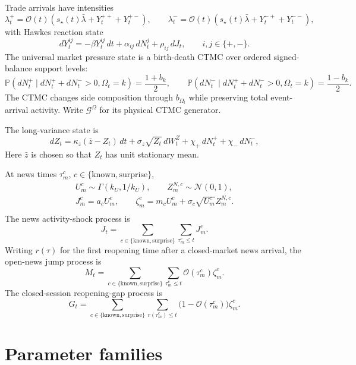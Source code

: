 \documentclass[11pt]{article}
\begin{document}
    Trade arrivals have intensities
    \[
        \lambda_t^+
        =
        \mathcal O(t)
        \left(s_\star(t)\bar\lambda+Y_t^{++}+Y_t^{+-}\right),
        \qquad
        \lambda_t^-
        =
        \mathcal O(t)
        \left(s_\star(t)\bar\lambda+Y_t^{-+}+Y_t^{--}\right),
    \]
    with Hawkes reaction state
    \[
        dY_t^{ij}
        =
        -\beta Y_t^{ij}\,dt
        +
        \alpha_{ij}\,dN_t^j
        +
        \rho_{ij}\,dJ_t,
        \qquad i,j\in\{+,-\}.
    \]
    The universal market pressure state is a birth-death CTMC over ordered
    signed-balance support levels:
    \[
        \mathbb P(dN_t^+\mid dN_t^++dN_t^->0,\Omega_t=k)
        =
        \frac{1+b_k}{2},
        \qquad
        \mathbb P(dN_t^-\mid dN_t^++dN_t^->0,\Omega_t=k)
        =
        \frac{1-b_k}{2}.
    \]
    The CTMC changes side composition through \(b_{\Omega_t}\) while preserving
    total event-arrival activity.
    Write \(\mathcal G^\Omega\) for its physical CTMC generator.

    The long-variance state is
    \[
        dZ_t
        =
        \kappa_z(\bar z-Z_t)\,dt
        +
        \sigma_z\sqrt{Z_t}\,dW_t^Z
        +
        \chi_+\,dN_t^+
        +
        \chi_-\,dN_t^-,
    \]
    Here \(\bar z\) is chosen so that \(Z_t\) has unit stationary mean.

    At news times \(\tau_m^c\), \(c\in\{\mathrm{known},\mathrm{surprise}\}\),
    \begin{gather*}
        U_m^c\sim\Gamma(k_U,1/k_U),
        \qquad
        Z_m^{N,c}\sim\mathcal N(0,1),\\
        J_m^c=a_c U_m^c,
        \qquad
        \zeta_m^c
        =
        m_c U_m^c+\sigma_c\sqrt{U_m^c}Z_m^{N,c}.\\
    \end{gather*}
    The news activity-shock process is
    \[
        J_t
        =
        \sum_{c\in\{\mathrm{known},\mathrm{surprise}\}}
        \sum_{\tau_m^c\le t}J_m^c.
    \]
    Writing \(r(\tau)\) for the first reopening time after a closed-market news
    arrival, the open-news jump process is
    \[
        M_t
        =
        \sum_{c\in\{\mathrm{known},\mathrm{surprise}\}}
        \sum_{\tau_m^c\le t}\mathcal O(\tau_m^c)\zeta_m^c.
    \]
    The closed-session reopening-gap process is
    \[
        G_t
        =
        \sum_{c\in\{\mathrm{known},\mathrm{surprise}\}}
        \sum_{r(\tau_m^c)\le t}
        \big(1-\mathcal O(\tau_m^c)\big)\zeta_m^c.
    \]

    \section*{Parameter families}
\end{document}
